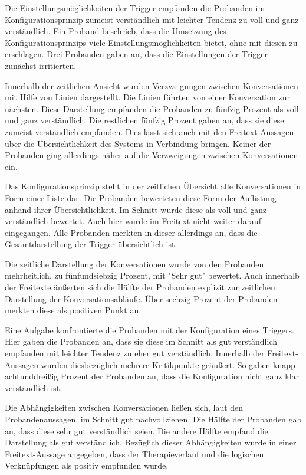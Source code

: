 Die Einstellungsmöglichkeiten der Trigger empfanden die Probanden im Konfigurationsprinzip zumeist verständlich mit leichter Tendenz zu voll und ganz verständlich. Ein Proband beschrieb, dass die Umsetzung des Konfigurationsprinzips viele Einstellungsmöglichkeiten bietet, ohne mit diesen zu erschlagen. Drei Probanden gaben an, dass die Einstellungen der Trigger zunächst irritierten. 

Innerhalb der zeitlichen Ansicht wurden Verzweigungen zwischen Konversationen mit Hilfe von Linien dargestellt. Die Linien führten von einer Konversation zur nächsten. Diese Darstellung empfanden die Probanden zu fünfzig Prozent als voll und ganz verständlich. Die restlichen fünfzig Prozent gaben an, dass sie diese zumeist verständlich empfanden. Dies lässt sich auch mit den Freitext-Aussagen über die Übersichtlichkeit des Systems in Verbindung bringen. Keiner der Probanden ging allerdings näher auf die Verzweigungen zwischen Konversationen ein.

Das Konfigurationsprinzip stellt in der zeitlichen Übersicht alle Konversationen in Form einer Liste dar. Die Probanden bewerteten diese Form der Auflistung anhand ihrer Übersichtlichkeit. Im Schnitt wurde diese als voll und ganz verständlich bewertet. Auch hier wurde im Freitext nicht weiter darauf eingegangen. Alle Probanden merkten in dieser allerdings an, dass die Gesamtdarstellung der Trigger übersichtlich ist. 

Die zeitliche Darstellung der Konversationen wurde von den Probanden mehrheitlich, zu fünfundsiebzig Prozent, mit "Sehr gut" bewertet. Auch innerhalb der Freitexte äußerten sich die Hälfte der Probanden explizit zur zeitlichen Darstellung der Konversationsabläufe. Über sechzig Prozent der Probanden merkten diese als positiven Punkt an.

Eine Aufgabe konfrontierte die Probanden mit der Konfiguration eines Triggers. Hier gaben die Probanden an, dass sie diese im Schnitt als gut verständlich empfanden mit leichter Tendenz zu eher gut verständlich. Innerhalb der Freitext-Aussagen wurden diesbezüglich mehrere Kritikpunkte geäußert. So gaben knapp achtunddreißig Prozent der Probanden an, dass die Konfiguration nicht ganz klar verständlich ist.

Die Abhängigkeiten zwischen Konversationen ließen sich, laut den Probandenaussagen, im Schnitt gut nachvollziehen. Die Hälfte der Probanden gab an, dass diese sehr gut verständlich seien. Die andere Hälfte empfand die Darstellung als gut verständlich. Bezüglich dieser Abhängigkeiten wurde in einer Freitext-Aussage angegeben, dass der Therapieverlauf und die logischen Verknüpfungen als positiv empfunden wurde. 

